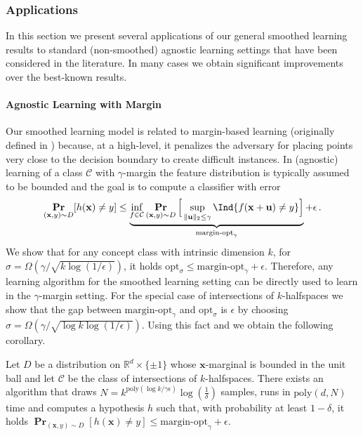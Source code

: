 \documentclass{theoretics}
\renewcommand\vec[1]{\mathbf{#1}}
\DeclareMathOperator*{\pr}{\mathbf{Pr}}
\newcommand{\R}{\mathbb{R}}
\newcommand{\eps}{\epsilon}
\newcommand{\poly}{\mathrm{poly}}
\newcommand{\1}{\Ind}
\newcommand{\smoothopt}{\mathrm{opt}_{\sigma}}
\newcommand{\x}{\vec x}
\begin{document}
\subsubsection{Applications}
In this section we present several applications of our general smoothed learning results to standard (non-smoothed) agnostic learning settings that have been considered in the literature. 
In many cases we obtain significant improvements over the best-known results.

\paragraph{Agnostic Learning with Margin}
Our smoothed learning model is related to margin-based learning (originally defined in \cite{BS00}) because, at a high-level, it
penalizes the adversary for placing points very close to the decision boundary to create
difficult instances.  In (agnostic) learning of a class $\mathcal C$ with $\gamma$-margin 
the feature distribution is typically assumed to be bounded and the goal is to compute a classifier with error 
\begin{equation}
\label{eq:margin-opt}
\pr_{(\x,y) \sim D}[h(\x) \neq y] \leq 
\underbrace{\inf_{f \in \mathcal C}\pr_{(\x,y) \sim D}\Big[\sup_{\|\vec u\|_2 \leq \gamma} \1\{f(\x + \vec u) \neq y\} \Big]}_{\text{margin-opt}_\gamma}
+ \eps\,.
\end{equation}
We show that for any concept class with intrinsic dimension $k$, for $\sigma = \Omega(\gamma/\sqrt{k \log(1/\eps)})$, it holds
$\smoothopt \leq \text{margin-opt}_\gamma + \eps$. Therefore, any learning algorithm for 
the smoothed learning setting can be directly used to learn in the $\gamma$-margin setting.
For the special case of intersections of $k$-halfspaces we show that the gap between
$\text{margin-opt}_{\gamma}$ and $\smoothopt$ is $\eps$ by choosing 
$\sigma = \Omega(\gamma/\sqrt{\log k \log(1/\eps)})$. Using this fact and  we obtain the following corollary.

\begin{corollary}
\label{inf:margin-intersections} 
Let $D$ be a distribution on $\R^d \times \{ \pm 1\}$ whose $\x$-marginal is bounded in the unit ball and let $\mathcal C$ be the class of intersections of $k$-halfspaces.
There exists an algorithm that draws $N = k^{\poly(\log k/\gamma \eps)}\log(\frac{1}{\delta})$ samples, runs in $\poly(d, N)$ time and computes a hypothesis $h$ such that, with probability at least $1-\delta$, 
it holds $\pr_{(\x,y)\sim D}[h(\x) \neq y] \leq \mathrm{margin}$-$\mathrm{opt}_\gamma + \eps$.
\end{corollary}
\end{document}
